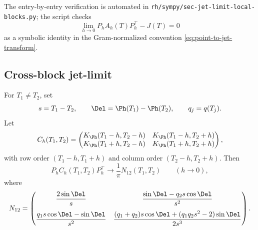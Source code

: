 \begin{remark}
\label{rem:same-point-jet-limit-sympy}
The entry-by-entry verification is automated in
\texttt{rh/sympy/sec-jet-limit-local-blocks.py}; the script checks
\[
\lim_{h\to0}P_hA_h(T)P_h^\top-J(T)=0
\]
as a symbolic identity in the Gram-normalized convention
\eqref{eq:point-to-jet-transform}.
\end{remark}

\subsection{Cross-block jet-limit}
\label{subsec:cross-block-jet-limit}

\begin{lemma}
\label{lem:cross-block-jet-limit}
For \(T_1\ne T_2\), set
\[
s=T_1-T_2,\qquad \Del=\Ph(T_1)-\Ph(T_2),\qquad q_j=q(T_j).
\]
Let
\[
C_h(T_1,T_2)=
\begin{pmatrix}
K_\Ph(T_1-h,T_2-h) & K_\Ph(T_1-h,T_2+h)\\
K_\Ph(T_1+h,T_2-h) & K_\Ph(T_1+h,T_2+h)
\end{pmatrix},
\]
with row order \((T_1-h,T_1+h)\) and column order
\((T_2-h,T_2+h)\).  Then
\[
P_h C_h(T_1,T_2)P_h^\top \longrightarrow
\frac1\pi N_{12}(T_1,T_2)
\qquad (h\to0),
\]
where
\begin{equation}
\label{eq:cross-N12}
N_{12}=
\begin{pmatrix}
\dfrac{2\sin\Del}{s}
&
\dfrac{\sin\Del-q_2s\cos\Del}{s^2}
\\[2.4ex]
\dfrac{q_1s\cos\Del-\sin\Del}{s^2}
&
\dfrac{(q_1+q_2)s\cos\Del+(q_1q_2s^2-2)\sin\Del}{2s^3}
\end{pmatrix}.
\end{equation}
\end{lemma}

